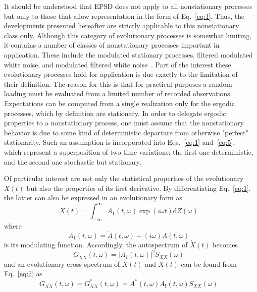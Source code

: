 \documentclass{article}
\begin{document}
It should be understood that EPSD does not apply to all nonstationary
processes but only to those that allow representation in the form of
Eq.~\eqref{eq:1}. Thus, the developments presented hereafter are strictly
applicable to this nonstationary class only. Although this category of
evolutionary processes is somewhat limiting, it contains a number of classes
of nonstationary processes important in application. These include the
modulated stationary processes, filtered modulated white noise, and modulated
filtered white noise~{\cite{NigamNarayanan1994}}. Part of the interest these
evolutionary processes hold for application is due exactly to the limitation
of their definition. The reason for this is that for practical purposes a
random loading must be evaluated from a limited number of recorded
observations. Expectations can be computed from a single realization only for
the ergodic processes, which by definition are stationary. In order to
delegate ergodic properties to a nonstationary process, one must assume that
the nonstationary behavior is due to some kind of deterministic departure from
otherwise "perfect" stationarity. Such an assumption is incorporated into
Eqs.~\eqref{eq:1} and~\eqref{eq:5}, which represent a superposition of two
time variations: the first one deterministic, and the second one stochastic
but stationary.

Of particular interest are not only the statistical properties of the
evolutionary $X (t)$ but also the properties of its first derivative. By
differentiating Eq.~\eqref{eq:1}, the latter can also be expressed in an
evolutionary form as
\begin{equation}
  \dot{X} (t) = \int_{- \infty}^{\infty} A_1 (t, \omega) \exp (i \omega t)
  \mathrm{d} Z (\omega) \label{eq:9}
\end{equation}
where
\begin{equation}
  A_1 (t, \omega) = \dot{A} (t, \omega) + (i \omega) A (t, \omega)
  \label{eq:10}
\end{equation}
is its modulating function. Accordingly, the autospectrum of $\dot{X} (t)$
becomes
\begin{equation}
  G_{\dot{X}  \dot{X}} (t, \omega) = | A_1 (t, \omega) |^2 S_{XX} (\omega)
  \label{eq:11}
\end{equation}
and an evolutionary cross-spectrum of $X (t)$ and $\dot{X} (t)$ can be found
from Eq.~\eqref{eq:7} as
\begin{equation}
  G_{X \dot{X}} (t, \omega) = G_{\dot{X} X}^{\ast} (t, \omega) = A^{\ast} (t,
  \omega) A_{\mathrm{I}} (t, \omega) S_{XX} (\omega) \label{eq:12}
\end{equation}
\end{document}
